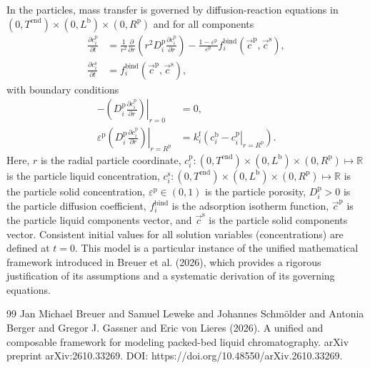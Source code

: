\documentclass{article}
\begin{document}
In the particles, mass transfer is governed by diffusion-reaction equations in $(0, T^{\mathrm{end}}) \times (0, L^{\mathrm{b}})\times (0, R^{\mathrm{p}})$ and for all components
\begin{align}
    \frac{\partial c^{\mathrm{p}}_{i}}{\partial t}
    &= \frac{1}{r^{2}} \frac{\partial }{\partial r} \left( r^{2} D^{\mathrm{p}}_{i} \frac{\partial c^{\mathrm{p}}_{i}}{\partial r} \right)
        - \frac{1 - \varepsilon^{\mathrm{p}}}{\varepsilon^{\mathrm{p}}}f^{\mathrm{bind}}_{i}\left( \vec{c}^{\mathrm{p}}, \vec{c}^{\mathrm{s}} \right),
    \\
    \frac{\partial c^{\mathrm{s}}_{i}}{\partial t}
    &= f^{\mathrm{bind}}_{i}\left( \vec{c}^{\mathrm{p}}, \vec{c}^{\mathrm{s}} \right),
\end{align}
with boundary conditions
\begin{align}
    - \left. \left( D^{\mathrm{p}}_{i} \frac{\partial c^{\mathrm{p}}_{i}}{\partial r} \right) \right|_{r=0}
    &= 0,
    \\
    \varepsilon^{\mathrm{p}} \left. \left( D^{\mathrm{p}}_{i} \frac{\partial c^{\mathrm{p}}_{i}}{\partial r} \right)\right|_{r = R^{\mathrm{p}}}
    &= k^{\mathrm{f}}_{i} \left. \left( c^{\mathrm{b}}_{i} - c^{\mathrm{p}}_{i} \right|_{r = R^{\mathrm{p}}} \right).
\end{align}
Here, $r$ is the radial particle coordinate, $c^{\mathrm{p}}_{i}\colon (0, T^{\mathrm{end}}) \times (0, L^{\mathrm{b}})\times (0, R^{\mathrm{p}}) \mapsto \mathbb{R}$ is the particle liquid concentration, $c^{\mathrm{s}}_{i}\colon (0, T^{\mathrm{end}}) \times (0, L^{\mathrm{b}})\times (0, R^{\mathrm{p}}) \mapsto \mathbb{R}$ is the particle solid concentration, $\varepsilon^{\mathrm{p}}\in (0, 1)$ is the particle porosity, $D^{\mathrm{p}}_{i}> 0$ is the particle diffusion coefficient, $f^{\mathrm{bind}}_{i}$ is the adsorption isotherm function, $\vec{c}^{\mathrm{p}}$ is the particle liquid components vector, and $\vec{c}^{\mathrm{s}}$ is the particle solid components vector.
Consistent initial values for all solution variables (concentrations) are defined at $t = 0$.
This model is a particular instance of the unified mathematical framework introduced in Breuer et al. (2026), which provides a rigorous justification of its assumptions and a systematic derivation of its governing equations.
\begin{thebibliography}{99}
     Jan Michael Breuer and Samuel Leweke and Johannes Schmölder and Antonia Berger and Gregor J. Gassner and Eric von Lieres (2026). A unified and composable framework for modeling packed-bed liquid chromatography. arXiv preprint arXiv:2610.33269. DOI: https://doi.org/10.48550/arXiv.2610.33269.
\end{thebibliography}
\end{document}
